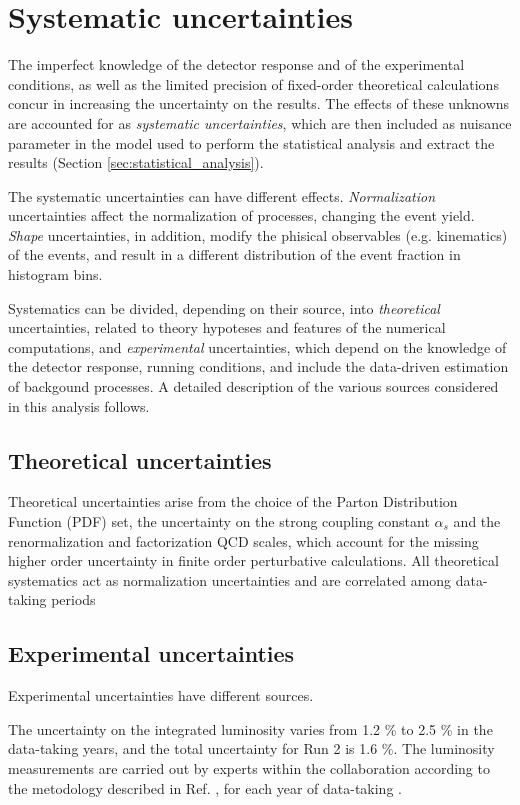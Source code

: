 \section{Systematic uncertainties}
\label{sec:systematics}
The imperfect knowledge of the detector response and of the experimental conditions, as well as the limited precision of fixed-order theoretical calculations concur in increasing the uncertainty on the results.
The effects of these unknowns are accounted for as \textit{systematic uncertainties}, which are then included as nuisance parameter in the model used to perform the statistical analysis and extract the results (Section \ref{sec:statistical_analysis}).

The systematic uncertainties can have different effects.
\textit{Normalization} uncertainties affect the normalization of processes, changing the event yield.
\textit{Shape} uncertainties, in addition, modify the phisical observables (e.g. kinematics) of the events, and result in a different distribution of the event fraction in histogram bins.

Systematics can be divided, depending on their source, into \textit{theoretical} uncertainties, related to theory hypoteses and features of the numerical computations, and \textit{experimental} uncertainties, which depend on the knowledge of the detector response, running conditions, and include the data-driven estimation of backgound processes.
A detailed description of the various sources considered in this analysis follows.

\subsection{Theoretical uncertainties}
Theoretical uncertainties arise from the choice of the Parton Distribution Function (PDF) set,
the uncertainty on the strong coupling constant $\alpha_s$ and
the renormalization and factorization QCD scales, which account for the missing higher order uncertainty in finite order perturbative calculations.
All theoretical systematics act as normalization uncertainties and are correlated among data-taking periods

\subsection{Experimental uncertainties}
Experimental uncertainties have different sources.

The uncertainty on the integrated luminosity varies from 1.2 \% to 2.5 \% in the data-taking years, and the total uncertainty for Run 2 is 1.6 \%.
The luminosity measurements are carried out by experts within the collaboration according to the metodology described in Ref. \cite{CMS:LUM-17-003}, for each year of data-taking \cite{CMS:LUM-17-004, CMS:LUM-18-002}.

